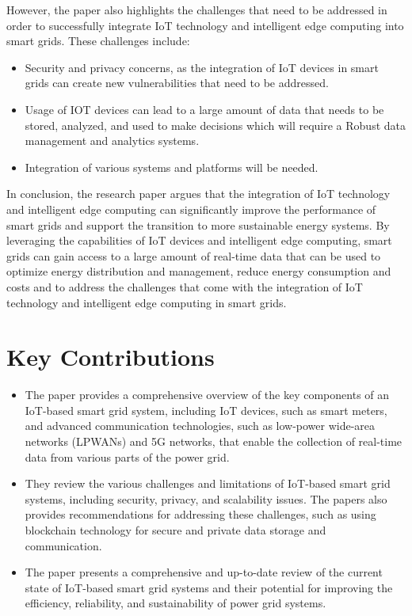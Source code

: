 \documentclass{article}
\begin{document}
However, the paper also highlights the challenges that need to be addressed in order to successfully integrate IoT technology and intelligent edge computing into smart grids. These challenges include:

\begin{itemize}
\item Security and privacy concerns, as the integration of IoT devices in smart grids can create new vulnerabilities that need to be addressed.

\item Usage of IOT devices can lead to a large amount of data that needs to be stored, analyzed, and used to make decisions which will require a Robust data management and analytics systems.

\item Integration of various systems and platforms will be needed.
\end{itemize}

In conclusion, the research paper argues that the integration of IoT technology and intelligent edge computing can significantly improve the performance of smart grids and support the transition to more sustainable energy systems. By leveraging the capabilities of IoT devices and intelligent edge computing, smart grids can gain access to a large amount of real-time data that can be used to optimize energy distribution and management, reduce energy consumption and costs and to address the challenges that come with the integration of IoT technology and intelligent edge computing in smart grids.

\section{Key Contributions}
\begin{itemize}

\item The paper provides a comprehensive overview of the key components of an IoT-based smart grid system, including IoT devices, such as smart meters, and advanced communication technologies, such as low-power wide-area networks (LPWANs) and 5G networks, that enable the collection of real-time data from various parts of the power grid.

\item They review the various challenges and limitations of IoT-based smart grid systems, including security, privacy, and scalability issues. The papers also provides recommendations for addressing these challenges, such as using blockchain technology for secure and private data storage and communication.

\item The paper presents a comprehensive and up-to-date review of the current state of IoT-based smart grid systems and their potential for improving the efficiency, reliability, and sustainability of power grid systems.
\end{itemize}
\end{document}
